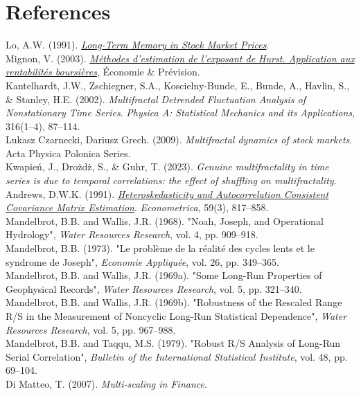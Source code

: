 \documentclass[11pt]{extarticle}
\begin{document}
\cleardoublepage

\section{References}

Lo, A.W. (1991). \textit{\href{http://www.e-m-h.org/Lo\_\_91.pdf}{Long-Term Memory in Stock Market Prices}}. \\

Mignon, V. (2003). \textit{\href{https://www.persee.fr/doc/ecop_0249-4744_1998_num_132_1_5909}{Méthodes d'estimation de l'exposant de Hurst. Application aux rentabilités boursières}}, Économie \& Prévision. \\

Kantelhardt, J.W., Zschiegner, S.A., Koscielny-Bunde, E., Bunde, A., Havlin, S., \& Stanley, H.E. (2002). \textit{Multifractal Detrended Fluctuation Analysis of Nonstationary Time Series}. \textit{Physica A: Statistical Mechanics and its Applications}, 316(1–4), 87–114. \\

Lukasz Czarnecki, Dariusz Grech. (2009). \textit{Multifractal dynamics of stock markets}. Acta Physica Polonica Series. \\

Kwapień, J., Drożdż, S., \& Guhr, T. (2023). \textit{Genuine multifractality in time series is due to temporal correlations: the effect of shuffling on multifractality}. \\

Andrews, D.W.K. (1991). \textit{\href{https://www.jstor.org/stable/2938229}{Heteroskedasticity and Autocorrelation Consistent Covariance Matrix Estimation}}. \textit{Econometrica}, 59(3), 817–858. \\

Mandelbrot, B.B. and Wallis, J.R. (1968). "Noah, Joseph, and Operational Hydrology", \textit{Water Resources Research}, vol. 4, pp. 909–918. \\

Mandelbrot, B.B. (1973). "Le problème de la réalité des cycles lents et le syndrome de Joseph", \textit{Economie Appliquée}, vol. 26, pp. 349–365. \\

Mandelbrot, B.B. and Wallis, J.R. (1969a). "Some Long-Run Properties of Geophysical Records", \textit{Water Resources Research}, vol. 5, pp. 321–340. \\

Mandelbrot, B.B. and Wallis, J.R. (1969b). "Robustness of the Rescaled Range R/S in the Measurement of Noncyclic Long-Run Statistical Dependence", \textit{Water Resources Research}, vol. 5, pp. 967–988. \\

Mandelbrot, B.B. and Taqqu, M.S. (1979). "Robust R/S Analysis of Long-Run Serial Correlation", \textit{Bulletin of the International Statistical Institute}, vol. 48, pp. 69–104. \\

Di Matteo, T. (2007). \textit{Multi-scaling in Finance}. \\
\end{document}
